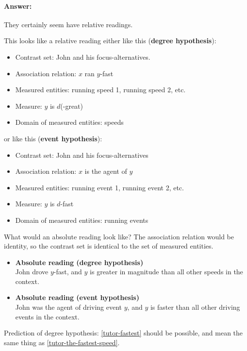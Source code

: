 \documentclass{article}
\begin{document}
\paragraph{Answer:} They certainly seem have relative readings.


This looks like a relative reading either like this (\textbf{degree hypothesis}):
\begin{itemize}
\item Contrast set: John and his focus-alternatives.
\item Association relation: $x$ ran $y$-fast
\item Measured entities: running speed 1, running speed 2, etc.
\item Measure: $y$ is $d$(-great)
\item Domain of measured entities: speeds
\end{itemize}
or like this (\textbf{event hypothesis}):
\begin{itemize}
\item Contrast set: John and his focus-alternatives
\item Association relation: $x$ is the agent of $y$
\item Measured entities: running event 1, running event 2, etc.
\item Measure: $y$ is $d$-fast
\item Domain of measured entities: running events
\end{itemize}
What would an absolute reading look like? The association relation
would be identity, so the contrast set is identical to the set of
measured entities. 
\begin{itemize}
\item \textbf{Absolute reading (degree hypothesis)}\\
John drove $y$-fast, and $y$ is greater in magnitude than all other
speeds in the context.
\item \textbf{Absolute reading (event hypothesis)}\\
John was the agent of driving event $y$, and $y$ is faster than all
other driving events in the context.
\end{itemize}
Prediction of degree hypothesis: \ref{tutor-fastest} should be
possible, and mean the same thing as \ref{tutor-the-fastest-speed}.

\end{document}
